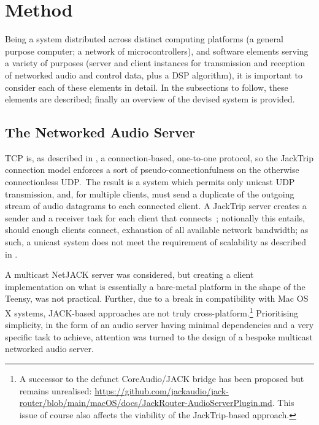 \section{Method}\label{sec:method}

Being a system distributed across distinct computing platforms (a general
purpose computer; a network of microcontrollers), and software elements
serving a variety of purposes (server and client instances for transmission
and reception of networked audio and control data, plus a DSP algorithm), it is
important to consider each of these elements in detail.
In the subsections to follow, these elements are described;
finally an overview of the devised system is provided.

\subsection{The Networked Audio Server}\label{subsec:the-networked-audio-server}

TCP is, as described in , a
connection-based, one-to-one protocol, so the JackTrip connection model enforces
a sort of pseudo-connectionfulness on the otherwise connectionless UDP.\
The result is a system which permits only unicast UDP transmission, and, for
multiple clients, must send a duplicate of the outgoing stream of audio
datagrams to each connected client.
A JackTrip server creates a sender and a receiver task for each client that
connects~\citep{caceres_jacktrip_2010};
notionally this entails, should enough clients connect, exhaustion of all
available network bandwidth;
as such, a unicast system does not meet the requirement of scalability as
described in \secref{subsec:distributed-audio-systems}.

A multicast NetJACK server was considered, but creating a client implementation
on what is essentially a bare-metal platform in the shape of the Teensy, was not
practical.
Further, due to a break in compatibility with Mac OS X systems, JACK-based
approaches are not truly cross-platform.\footnote{
    A successor to the defunct CoreAudio/JACK bridge has been proposed but
    remains unrealised:
    \url{https://github.com/jackaudio/jack-router/blob/main/macOS/docs/JackRouter-AudioServerPlugin.md}.
    This issue of course also affects the viability of the JackTrip-based
    approach.
}
Prioritising simplicity, in the form of an audio server having minimal
dependencies and a very specific task to achieve, attention was turned to the
design of a bespoke multicast networked audio server.

